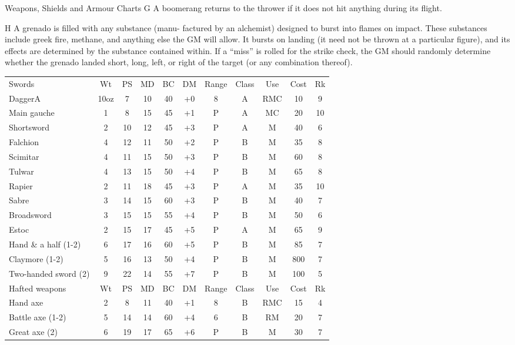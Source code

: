 \begin{Tables}{Weapons, Shields and Armour Charts}
G A boomerang returns to the thrower if it does not 
hit anything during its flight. 

H  A  grenado  is  filled  with  any  substance  (manu-
factured  by  an  alchemist)  designed  to  burst  into 
flames  on  impact.  These  substances  include  greek 
fire, methane, and anything else the GM will allow. 
It  bursts  on  landing  (it  need  not  be  thrown  at  a 
particular figure), and its effects are determined by 
the substance contained within. If a “miss” is rolled 
for  the  strike  check,  the  GM  should  randomly 
determine  whether  the  grenado  landed  short,  long, 
left,  or  right  of  the  target  (or  any  combination 
thereof). 

\begin{tabularx}{\linewidth}{Xcccccccccc}
Swords			& Wt	& PS	& MD	& BC	& DM	& Range	& Class	& Use	& Cost	& Rk	\\
DaggerA			& 10oz	& 7	& 10	& 40	& +0 	& 8	& A	& RMC	& 10	& 9	\\
Main gauche		& 1	& 8	& 15	& 45	& +1	& P	& A	& MC	& 20	& 10	\\
Shortsword		& 2	& 10	& 12	& 45	& +3	& P	& A	& M	& 40	& 6	\\
Falchion		& 4	& 12	& 11	& 50	& +2	& P	& B	& M	& 35	& 8	\\
Scimitar		& 4	& 11	& 15	& 50	& +3	& P	& B	& M	& 60	& 8	\\
Tulwar			& 4	& 13	& 15	& 50	& +4	& P	& B	& M	& 65	& 8	\\
Rapier			& 2	& 11	& 18	& 45	& +3	& P	& A	& M	& 35	& 10	\\
Sabre			& 3	& 14	& 15	& 60	& +3	& P	& B	& M	& 40	& 7	\\
Broadsword		& 3	& 15	& 15	& 55	& +4	& P	& B	& M	& 50	& 6	\\
Estoc			& 2	& 15	& 17	& 45	& +5	& P	& A	& M	& 65	& 9	\\
Hand \& a half (1-2)	& 6	& 17	& 16	& 60	& +5	& P	& B	& M	& 85	& 7	\\
Claymore (1-2)		& 5	& 16	& 13	& 50	& +4	& P	& B	& M	& 800	& 7	\\
Two-handed sword (2)	& 9	& 22	& 14	& 55	& +7	& P	& B	& M	& 100	& 5	\\ 
Hafted weapons		& Wt	& PS	& MD	& BC	& DM	& Range	& Class	& Use	& Cost	& Rk	\\
Hand axe		& 2	& 8	& 11	& 40	& +1	& 8	& B	& RMC	& 15	& 4	\\
Battle axe (1-2)	& 5 	& 14	& 14	& 60	& +4	& 6	& B	& RM	& 20	& 7	\\
Great axe (2)		& 6	& 19	& 17	& 65	& +6	& P	& B	& M	& 30	& 7	\\

\end{tabularx}
\end{Tables}
